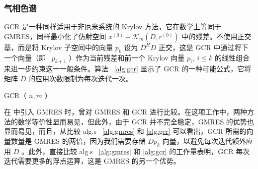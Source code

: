 \documentclass[5p,times,a4paper,fleqn]{cas-dc}
\begin{document}
   \subsubsection{气相色谱  }       \label{subsubsect:gcr}     

GCR    \cite{elman1982iterative}    是一种同样适用于非厄米系统的 Krylov 方法，它在数学上等同于 GMRES，同样最小化了仿射空间    $x^{(0)} + \mathcal{K}_{m}(D,r^{(0)})$    中的残差。不使用正交基，而是将 Krylov 子空间中的向量    $p_{k}$    设为    $D^{H}D$    正交，这是 GCR 中通过将下一个向量（即 \     $p_{k+1}$   ）作为当前残差和前一个 Krylov 向量    $p_{i},  \  i \leq k$    的线性组合来进一步约束这一一般条件。算法 \     \ref{alg:gcr}    显示了 GCR 的一种可能公式，它将矩阵    $D$    的应用次数限制为每次迭代一次。  

   \begin{algorithm}
\caption{GCR（   $n,m$   ）  } \label{alg:gcr}
\end{algorithm}     

在    \cite{saad1986}    中引入 GMRES 时，曾对 GMRES 和 GCR 进行比较。在这项工作中，两种方法的数学等价性显而易见，但此外，由于 GCR 并不完全稳定，GMRES 的优势也显而易见，而且，从比较 alg.s \     \ref{alg:gmres}    和    \ref{alg:gcr}    可以看出，GCR 所需的向量数量是 GMRES 的两倍，因为我们需要存储    $Dp_{k}$    向量，以避免每次迭代额外应用    $D$   。此外，直接比较 alg.s \     \ref{alg:gmres}    和    \ref{alg:gcr}    的工作量表明，GCR 每次迭代需要更多的浮点运算，这是 GMRES 的另一个优势。  
\end{document}
